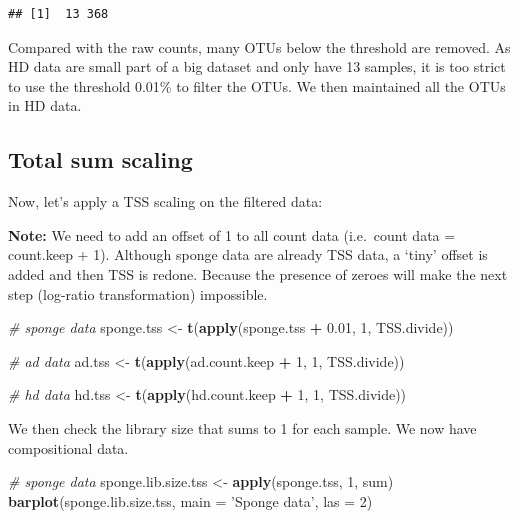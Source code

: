 \documentclass[]{book}
\newenvironment{Shaded}{\begin{snugshade}}{\end{snugshade}}
\newcommand{\KeywordTok}[1]{\textcolor[rgb]{0.13,0.29,0.53}{\textbf{#1}}}
\newcommand{\DataTypeTok}[1]{\textcolor[rgb]{0.13,0.29,0.53}{#1}}
\newcommand{\DecValTok}[1]{\textcolor[rgb]{0.00,0.00,0.81}{#1}}
\newcommand{\FloatTok}[1]{\textcolor[rgb]{0.00,0.00,0.81}{#1}}
\newcommand{\StringTok}[1]{\textcolor[rgb]{0.31,0.60,0.02}{#1}}
\newcommand{\CommentTok}[1]{\textcolor[rgb]{0.56,0.35,0.01}{\textit{#1}}}
\newcommand{\OperatorTok}[1]{\textcolor[rgb]{0.81,0.36,0.00}{\textbf{#1}}}
\newcommand{\NormalTok}[1]{#1}
\begin{document}
\begin{verbatim}
## [1]  13 368
\end{verbatim}

Compared with the raw counts, many OTUs below the threshold are removed.
As HD data are small part of a big dataset and only have 13 samples, it
is too strict to use the threshold 0.01\% to filter the OTUs. We then
maintained all the OTUs in HD data.

\subsection{Total sum scaling}\label{total-sum-scaling}

Now, let's apply a TSS scaling on the filtered data:

\textbf{Note:} We need to add an offset of 1 to all count data
(i.e.~count data = count.keep + 1). Although sponge data are already TSS
data, a `tiny' offset is added and then TSS is redone. Because the
presence of zeroes will make the next step (log-ratio transformation)
impossible.

\begin{Shaded}
\begin{Highlighting}[]
\CommentTok{# sponge data}
\NormalTok{sponge.tss <-}\StringTok{ }\KeywordTok{t}\NormalTok{(}\KeywordTok{apply}\NormalTok{(sponge.tss }\OperatorTok{+}\StringTok{ }\FloatTok{0.01}\NormalTok{, }\DecValTok{1}\NormalTok{, TSS.divide))}

\CommentTok{# ad data}
\NormalTok{ad.tss <-}\StringTok{ }\KeywordTok{t}\NormalTok{(}\KeywordTok{apply}\NormalTok{(ad.count.keep }\OperatorTok{+}\StringTok{ }\DecValTok{1}\NormalTok{, }\DecValTok{1}\NormalTok{, TSS.divide))}

\CommentTok{# hd data}
\NormalTok{hd.tss <-}\StringTok{ }\KeywordTok{t}\NormalTok{(}\KeywordTok{apply}\NormalTok{(hd.count.keep }\OperatorTok{+}\StringTok{ }\DecValTok{1}\NormalTok{, }\DecValTok{1}\NormalTok{, TSS.divide))}
\end{Highlighting}
\end{Shaded}

We then check the library size that sums to 1 for each sample. We now
have compositional data.

\begin{Shaded}
\begin{Highlighting}[]
\CommentTok{# sponge data}
\NormalTok{sponge.lib.size.tss <-}\StringTok{ }\KeywordTok{apply}\NormalTok{(sponge.tss, }\DecValTok{1}\NormalTok{, sum)}
\KeywordTok{barplot}\NormalTok{(sponge.lib.size.tss, }\DataTypeTok{main =}  \StringTok{'Sponge data'}\NormalTok{, }\DataTypeTok{las =} \DecValTok{2}\NormalTok{)}
\end{Highlighting}
\end{Shaded}
\end{document}
